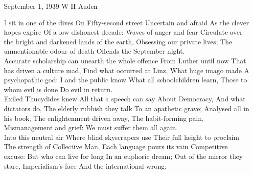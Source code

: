 \begin{poem}
{September 1, 1939}
{W H Auden}


                             I sit in one of the dives
                             On Fifty-second street
                             Uncertain and afraid
                             As the clever hopes expire
                             Of a low dishonest decade:
                             Waves of anger and fear
                             Circulate over the bright
                             and darkened lands of the earth,
                             Obsessing our private lives;
                             The unmentionable odour of death
                             Offends the September night.\\

                             Accurate scholarship can
                             unearth the whole offence
                             From Luther until now
                             That has driven a culture mad,
                             Find what occurred at Linz,
                             What huge imago made
                             A psychopathic god:
                             I and the public know
                             What all schoolchildren learn,
                             Those to whom evil is done
                             Do evil in return.\\

                             Exiled Thucydides knew
                             All that a speech can say
                             About Democracy,
                             And what dictators do,
                             The elderly rubbish they talk
                             To an apathetic grave;
                             Analysed all in his book,
                             The enlightenment driven away,
                             The habit-forming pain,
                             Mismanagement and grief:
                             We must suffer them all again.\\

                             Into this neutral air
                             Where blind skyscrapers use
                             Their full height to proclaim
                             The strength of Collective Man,
                             Each language pours its vain
                             Competitive excuse:
                             But who can live for long
                             In an euphoric dream;
                             Out of the mirror they stare,
                             Imperialism's face
                             And the international wrong.\\


\end{poem}
